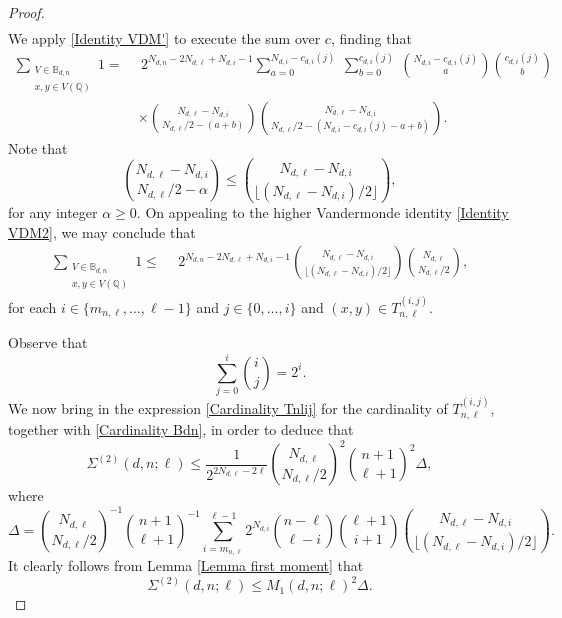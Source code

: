 \documentclass[11pt, reqno]{amsart}
\numberwithin{equation}{section}
\renewcommand{\leq}{\leqslant}
\renewcommand{\geq}{\geqslant}
\begin{document}
\begin{proof}
\begin{align*}
\end{align*}
We apply  \eqref{Identity VDM'} to execute the sum over $c$, finding that 
\begin{align*}
\sum_{\substack{V \in \mathbb{B}_{d,n} \\ x, y \in V(\mathbb{Q})}} 1 =~ & \ 2^{N_{d,n}-2N_{d,\ell}+N_{d,i}-1} \sum_{a=0}^{N_{d,i}-c_{d,i}(j)} \ \sum_{b=0}^{c_{d,i}(j)}\
 \binom{N_{d,i}-c_{d,i}(j)}{a} \binom{c_{d,i}(j)}{b} \\
&\times
 \binom{N_{d,\ell}-N_{d,i}}{N_{d,\ell}/2-(a+b)} 
\binom{N_{d,\ell}-N_{d,i}}{N_{d,\ell}/2-\left(N_{d,i}-c_{d,i}(j)-a+b\right)} .
\end{align*}
Note that 
$$
\binom{N_{d,\ell}-N_{d,i}}{N_{d,\ell}/2-\alpha} 
\leq \binom{N_{d,\ell}-N_{d,i}}{
\lfloor (N_{d,\ell}-N_{d,i})/2\rfloor
},
$$
for any integer $\alpha\geq 0$.
On appealing to  the higher Vandermonde identity
\eqref{Identity VDM2}, we may conclude that 
\begin{align*}
\sum_{\substack{V \in \mathbb{B}_{d,n} \\ x, y \in V(\mathbb{Q})}} 1 \leq ~ & \ 2^{N_{d,n}-2N_{d,\ell}+N_{d,i}-1} 
\binom{N_{d,\ell}-N_{d,i}}{
\lfloor (N_{d,\ell}-N_{d,i})/2\rfloor
}
\binom{N_{d,\ell}}{
N_{d,\ell}/2},
\end{align*}
for each $i\in \{m_{n,\ell},\dots, \ell-1\}$ and  $j \in \{0, \dots, i\}$ and $(x, y) \in T_{n,\ell}^{(i,j)}$.

Observe that
$$
 \sum_{j=0}^i \binom{i}{j}=2^i.
$$
We now bring in the expression \eqref{Cardinality Tnlij} for the 
cardinality of $T_{n,\ell}^{(i,j)}$, together with \eqref{Cardinality Bdn}, in order to deduce that 
$$
\Sigma^{(2)}(d,n;\ell) \leq 
\frac{1}{2^{2N_{d,\ell}-2\ell}}\binom{N_{d,\ell}}{
N_{d,\ell}/2}^2\binom{n+1}{\ell+1}^2\Delta,
$$
where
$$
\Delta
=
\binom{N_{d,\ell}}{
N_{d,\ell}/2}^{-1}\binom{n+1}{\ell+1}^{-1}
 \sum_{i=m_{n,\ell}}^{\ell-1} 
 2^{N_{d,i}} 
 \binom{n-\ell}{\ell-i} \binom{\ell+1}{i+1} 
 \binom{N_{d,\ell}-N_{d,i}}{
\lfloor (N_{d,\ell}-N_{d,i})/2\rfloor
}.
$$
It clearly follows from Lemma \ref{Lemma first moment} that 
\begin{equation}\label{eq:leaf}
\Sigma^{(2)}(d,n;\ell) \leq 
M_1(d,n;\ell)^2
\Delta.
\end{equation}


\end{proof}
\end{document}
